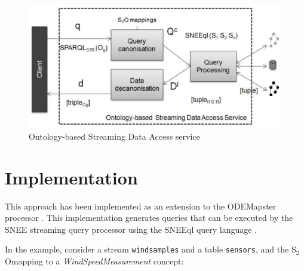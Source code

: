 \documentclass[runningheads,a4paper]{llncs}
\newcommand{\subscript}[1]{\ensuremath{_{\textrm{#1}}}}
\newcommand{\stwoo}{\textsf{S\subscript{2}O}}
\begin{document}


\begin{figure}[here]
\vspace{-20pt} \hspace{20pt}
\begin{center}
\includegraphics[width=8 cm]{img/approach}
\end{center}
\vspace{-10pt} \caption{Ontology-based Streaming Data Access service} \label{fig:SemanticIntegrator} \vspace{-20pt}
\end{figure}



\section{Implementation}
\label{execution}

This approach has been implemented as an extension to the
ODEMapster processor \cite{Barrasa_04}. This implementation generates queries that can be executed by the SNEE streaming query processor using the SNEEql query language \cite{Brenninkmeijer_08}.

In the example, consider a stream \texttt{windsamples} and a table \texttt{sensors}, and the \stwoo mapping to a \textit{WindSpeedMeasurement} concept:
\end{document}
